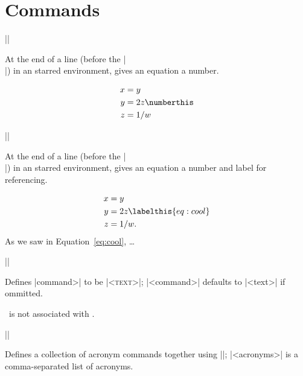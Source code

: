 \documentclass{ltxguidex}
\begin{document}
\section{Commands}

\begin{desc}
|\numberthis|
\end{desc}

At the end of a line (before the |\\|) in an  starred
environment, gives an equation a number.

\begin{LTXexample}
\begin{alignat*}{2}
  x &= y \\
  y &= 2z \numberthis \\
  z &= 1/w
\end{alignat*}
\end{LTXexample}

\begin{desc}
||
\end{desc}

At the end of a line (before the |\\|) in an  starred
environment, gives an equation a number and label for referencing.

\begin{LTXexample}
\begin{alignat*}{2}
  x &= y \\
  y &= 2z \labelthis{eq:cool} \\
  z &= 1/w.
\end{alignat*}
As we saw in
Equation~\ref{eq:cool}, \dots
\end{LTXexample}

\begin{desc}
||
\end{desc}

Defines |\<command>| to be |\textsc{<text>}|; |<command>| defaults to |<text>|
if ommitted.

\begin{LTXexample}

\nist\ is not associated
with \seetan.
\end{LTXexample}

\begin{desc}
||
\end{desc}

Defines a collection of acronym commands together using |\newacronym|;
|<acronyms>| is a comma-separated list of acronyms.
\end{document}
